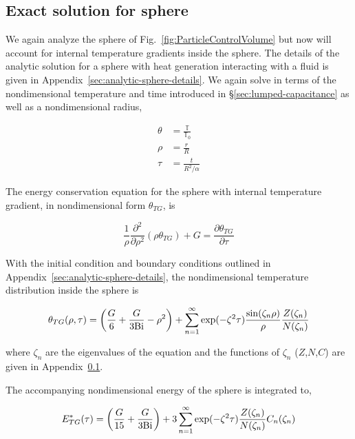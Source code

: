 \subsection{Exact solution for sphere}\label{sec:analytic-sphere}

We again analyze the sphere of Fig.~\ref{fig:ParticleControlVolume} but now will account for internal temperature gradients inside the sphere. The details of the analytic solution for a sphere with heat generation interacting with a fluid is given in Appendix~\ref{sec:analytic-sphere-details}. We again solve in terms of the nondimensional temperature and time introduced in \S\ref{sec:lumped-capacitance} as well as a nondimensional radius,

\begin{align*}
    \theta &= \frac{\mathbb{T}}{\mathbb{T}_0}\\
    \rho & = \frac{r}{R}\\
    \tau & = \frac{t}{R^2/\alpha}
\end{align*}

The energy conservation equation for the sphere with internal temperature gradient, in nondimensional form $\theta_{TG}$, is

\begin{equation}
    \frac{1}{\rho}\frac{\partial^2}{\partial \rho^2}(\rho\theta_{TG}) + G = \frac{\partial\theta_{TG}}{\partial \tau}
\end{equation}

With the initial condition and boundary conditions outlined in Appendix~\ref{sec:analytic-sphere-details}, the nondimensional temperature distribution inside the sphere is 

\begin{equation}\label{eq:analytic-temperature-distribution}
    \theta_{TG}(\rho,\tau) = \left(\frac{G}{6} + \frac{G}{3\mathrm{Bi}}-\rho^2\right)  +   \sum_{n=1}^\infty \exp(-\zeta^2 \tau) \frac{\sin(\zeta_n \rho)}{\rho} \frac{Z(\zeta_n)}{N(\zeta_n)}  
\end{equation}

where $\zeta_n$ are the eigenvalues of the equation and the functions of $\zeta_n$ ($Z$,$N$,$C$) are given in Appendix~\ref{sec:analytic-sphere}. 

The accompanying nondimensional energy of the sphere is integrated to,

\begin{equation}
\label{eq:analytic-energy-profile}
    E^*_{TG}(\tau)=\left(\frac{G}{15}+\frac{G}{3\mathrm{Bi}}\right)+3\sum_{n=1}^\infty \exp(-\zeta^2 \tau) \frac{Z(\zeta_n)}{N(\zeta_n)} C_n(\zeta_n)
\end{equation}


